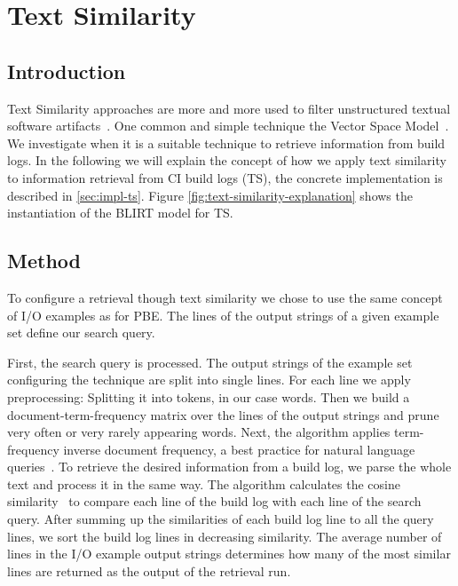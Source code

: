 \documentclass[\myrootdir/main.tex]{subfiles}
\begin{document}
\section{Text Similarity}
\label{sec:expl-ts}

\subsection{Introduction}
Text Similarity approaches are more and more used to filter unstructured textual software artifacts~\cite{runeson2007detection,marcus2005recovery,antoniol2002recovering,mccarey2006recommending}.
One common and simple technique the Vector Space Model~\cite{schutze2008introduction}.
We investigate when it is a suitable technique to retrieve information from build logs.
In the following we will explain the concept of how we apply text similarity to information retrieval from CI build logs (TS), the concrete implementation is described in \ref{sec:impl-ts}.
Figure \ref{fig:text-similarity-explanation} shows the instantiation of the BLIRT model for TS.

\subsection{Method}
To configure a retrieval though text similarity we chose to use the same concept of I/O examples as for PBE.
The lines of the output strings of a given example set define our search query.

First, the search query is processed.
The output strings of the example set configuring the technique are split into single lines.
For each line we apply preprocessing: Splitting it into tokens, in our case words.
Then we build a document-term-frequency matrix over the lines of the output strings and prune very often or very rarely appearing words.
Next, the algorithm applies term-frequency inverse document frequency, a best practice for natural language queries~\cite{lee1997document}.
To retrieve the desired information from a build log, we parse the whole text and process it in the same way.
The algorithm calculates the cosine similarity~\cite{korenius2007principal} to compare each line of the build log with each line of the search query.
After summing up the similarities of each build log line to all the query lines, we sort the build log lines in decreasing similarity.
The average number of lines in the I/O example output strings determines how many of the most similar lines are returned as the output of the retrieval run.
\end{document}
